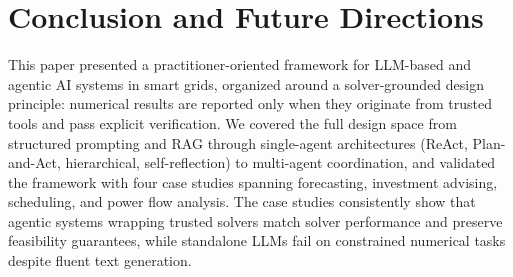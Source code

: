 \documentclass[journal,onecolumn]{IEEEtran} %
\begin{document}





\section{Conclusion and Future Directions}
\label{sec:conclusion}
This paper presented a practitioner-oriented framework for LLM-based and agentic AI systems in smart grids, organized around a solver-grounded design principle: numerical results are reported only when they originate from trusted tools and pass explicit verification. We covered the full design space from structured prompting and RAG through single-agent architectures (ReAct, Plan-and-Act, hierarchical, self-reflection) to multi-agent coordination, and validated the framework with four case studies spanning forecasting, investment advising, scheduling, and power flow analysis. The case studies consistently show that agentic systems wrapping trusted solvers match solver performance and preserve feasibility guarantees, while standalone LLMs fail on constrained numerical tasks despite fluent text generation.
\end{document}
